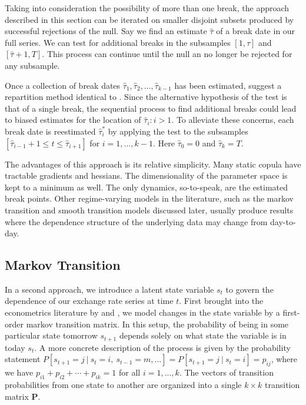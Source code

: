 \documentclass[12pt]{article}
\begin{document}
Taking into consideration the possibility of more than one break, the approach described in this section can be iterated on smaller disjoint subsets produced by successful rejections of the null. Say we find an estimate $\hat{\tau}$ of a break date in our full series. We can test for additional breaks in the subsamples $\left[1, \hat{\tau}\right]$ and $\left[\hat{\tau} + 1, T\right]$. This process can continue until the null an no longer be rejected for any subsample.

Once a collection of break dates $\hat{\tau}_{1},\hat{\tau}_{2},...,\hat{\tau}_{k-1}$ has been estimated, \cite{Dias_and_Embrechts_2009} suggest a repartition method identical to \cite{Bai_1997}. Since the alternative hypothesis of the test is that of a single break, the sequential process to find additional breaks could lead to biased estimates for the location of $\hat{\tau}_{i}:i > 1$. To alleviate these concerns, each break date is reestimated $\hat{\tau}_{i}^{\ast}$ by applying the test to the subsamples $\left[ \hat{\tau}_{i-1}+1\leq t\leq \hat{\tau}_{i+1}\right]$ for $i=1,...,k-1$. Here $\hat{\tau}_{0} = 0$ and $\hat{\tau}_{k} = T$.

The advantages of this approach is its relative simplicity. Many static copula have tractable gradients and hessians. The dimensionality of the parameter space is kept to a minimum as well. The only dynamics, so-to-speak, are the estimated break points. Other regime-varying models in the literature, such as the markov transition and smooth transition models discussed later, usually produce results where the dependence structure of the underlying data may change from day-to-day.

\subsection{Markov Transition}

In a second approach, we introduce a latent state variable $s_{t}$ to govern the dependence of our exchange rate series at time $t$. First brought into the econometrics literature by \cite{Hamilton_1989} and \cite{Hamilton_1994}, we model changes in the state variable by a first-order markov transition matrix. In this setup, the probability of being in some particular state tomorrow $s_{t+1}$ depends solely on what state the variable is in today $s_{t}$. A more concrete description of the process is given by the probability statement $P\left[s_{t + 1} = j~|~s_{t}=i,~s_{t-1} = m,\ldots \right] = P\left[s_{t+1}=j~|~s_{t} = i\right] = p_{ij}$, where we have $p_{i1} + p_{i2} + \cdots + p_{ik}=1$ for all $i = 1,...,k$. The vectors of transition probabilities from one state to another are organized into a single $k\times k$ transition matrix $\mathbf{P}$.
\end{document}
